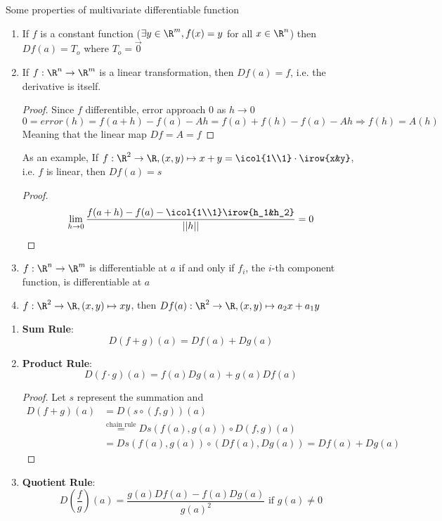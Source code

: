 \documentclass[11pt]{article}
\begin{document}
\begin{defn*}
  Some properties of multivariate differentiable function
  \begin{enumerate}
      \item If $f$ is a constant function ($\exists y\in\R^m, f(x)=y$ for all $x\in\R^n$) then $Df(a) = T_o$ where $T_o = \vec{0}$
      \item If $f:\R^n \to\R^m$ is a linear transformation, then $Df(a) = f$, i.e. the derivative is itself.
      \begin{proof}
        Since $f$ differentible, error approach 0 as $h\to 0$
        \[
          0 = error(h) = f(a+h)-f(a)-Ah = f(a) + f(h) - f(a) - Ah \Rightarrow f(h) = A(h)
        \]
        Meaning that the linear map $Df = A = f$
      \end{proof}
      As an example, If $f:\R^2\to\R, (x,y)\mapsto x+y = \icol{1\\1}\cdot \irow{x&y}$, i.e. $f$ is linear, then $Df(a) = s$
      \begin{proof}
        \[
          \lim_{h\to0}\frac{f(a+h)- f(a) - \icol{1\\1}\irow{h_1&h_2}}{||h||} = 0
        \]
      \end{proof}
      \item $f: \R^n\to\R^m$ is differentiable at $a$ if and only if $f_i$, the $i$-th component function, is differentiable at $a$
      \item $f:\R^2\to\R, (x,y)\mapsto xy$, then $Df(a): \R^2\to\R, (x,y) \mapsto a_2x + a_1y$
  \end{enumerate}
\end{defn*}

\begin{theorem*}
  \label{sum, product, quotient rule}
  \begin{enumerate}
    Let $f,g: \R^n \to \R$, then
    \item \textbf{Sum Rule}:
    \[
      D(f+g)(a) = Df(a) + Dg(a)
    \]
    \item \textbf{Product Rule}:
    \[
      D(f\cdot g)(a) = f(a)Dg(a) + g(a)Df(a)
    \]
    \begin{proof}
      Let $s$ represent the summation and
      \begin{align*}
        D(f+g)(a) &= D(s\circ(f,g))(a)\\
        &\stackrel{\text{chain rule}}{=} Ds(f(a), g(a)) \circ D(f,g)(a) \\
        &= Ds(f(a), g(a)) \circ (Df(a), Dg(a)) = Df(a) + Dg(a)
      \end{align*}
    \end{proof}
    \item \textbf{Quotient Rule}:
    \[
      D(\frac{f}{g})(a) = \frac{g(a)Df(a) - f(a)Dg(a)}{g(a)^2} \text{ if } g(a)\neq 0
    \]
  \end{enumerate}

\end{theorem*}
\end{document}
